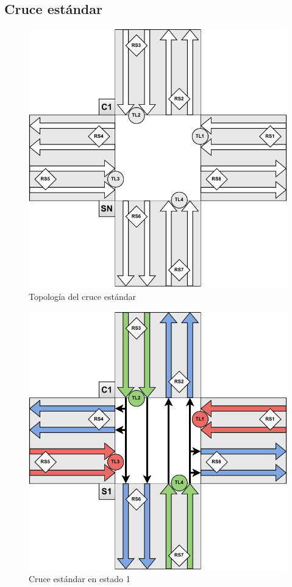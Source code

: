 \newpage
\subsection{Cruce estándar}
\begin{figure}[H]
    \centering
    \includegraphics[width=1\linewidth]{text/image/DCruc-CE-Topologia.pdf}
    \caption{Topología del cruce estándar}
    \label{fig:cruce_estandar_topologia}
\end{figure}

\begin{figure}[H]
    \centering
    \includegraphics[width=1\linewidth]{text/image/DCruc-CE-Estado1.pdf}
    \caption{Cruce estándar en estado 1}
    \label{fig:cruce_estandar_estado_1}
\end{figure}

